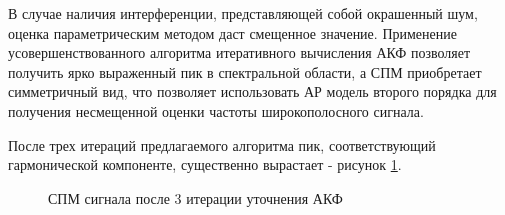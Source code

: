 
В случае наличия интерференции, представляющей собой окрашенный шум, оценка параметрическим методом даст смещенное значение.
Применение усовершенствованного алгоритма итеративного вычисления АКФ позволяет получить ярко выраженный пик в спектральной области,
а СПМ приобретает симметричный вид, что позволяет использовать АР модель второго порядка для получения несмещенной оценки частоты
широкополосного сигнала.

После трех 
итераций предлагаемого алгоритма пик, соответствующий гармонической компоненте, существенно вырастает - рисунок \ref{pic:GPS_spectrum_iter3}.
\begin{figure}[h]
	\center{}
	\caption{СПМ сигнала после 3 итерации уточнения АКФ}
	\label{pic:GPS_spectrum_iter3}
\end{figure}


